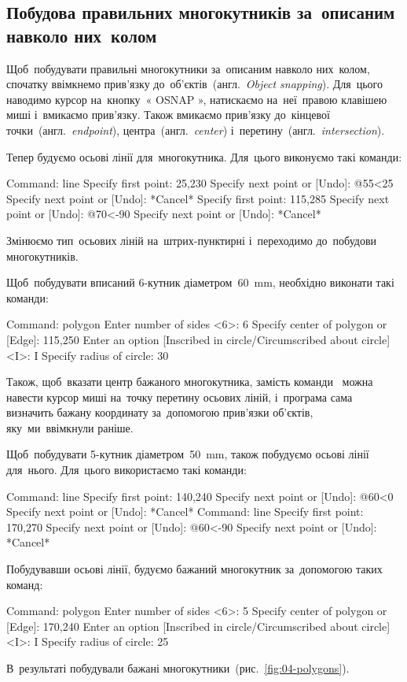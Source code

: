 \documentclass[
	a4paper,
	oneside,
	BCOR = 10mm,
	DIV = 12,
	12pt,
	headings = normal,
]{scrartcl}
\newcommand{\allcaps}[1]{%
	{%
		\addfontfeatures{%
			Letters = UppercaseSmallCaps,
			LetterSpace = 8,%
		}%
		#1%
	}%
}
\newcommand{\transeng}[1]{{англ.}~\textit{\textenglish{#1}}}
\begin{document}
		\subsection{Побудова правильних многокутників за~описаним навколо них~колом}
			Щоб~побудувати правильні многокутники за~описаним навколо них~колом, спочатку ввімкнемо прив'язку до~об'єктів~(\transeng{Object snapping}). Для~цього наводимо курсор на~кнопку~«\textenglish{\allcaps{OSNAP}}», натискаємо на~неї~правою клавішею миші і~вмикаємо прив'язку. Також вмикаємо прив'язку до~кінцевої точки~(\transeng{endpoint}), центра~(\transeng{center}) і~перетину~(\transeng{intersection}).

			Тепер будуємо осьові лінії для~многокутника. Для~цього виконуємо такі команди:
			\begin{codegeneric}
				Command: line
				Specify first point: 25,230
				Specify next point or [Undo]: @55<25
				Specify next point or [Undo]: *Cancel*
				Specify first point: 115,285
				Specify next point or [Undo]: @70<-90
				Specify next point or [Undo]: *Cancel*
			\end{codegeneric}
			Змінюємо тип~осьових ліній на~штрих-пунктирні і~переходимо до~побудови многокутників.

			Щоб~побудувати вписаний 6-кутник діаметром~\SI{60}{\milli\metre}, необхідно виконати такі команди:
			\begin{codegeneric}
				Command: polygon
				Enter number of sides <6>: 6
				Specify center of polygon or [Edge]: 115,250
				Enter an option [Inscribed in circle/Circumscribed about circle] <I>: I
				Specify radius of circle: 30
			\end{codegeneric}
			Також, щоб~вказати центр бажаного многокутника, замість команди~ можна навести курсор миші на~точку перетину осьових ліній, і~програма сама визначить бажану координату за~допомогою прив'язки об'єктів, яку~ми~ввімкнули раніше.

			Щоб~побудувати 5-кутник діаметром~\SI{50}{\milli\metre}, також побудуємо осьові лінії для~нього. Для~цього використаємо такі команди:
			\begin{codegeneric}
				Command: line
				Specify first point: 140,240
				Specify next point or [Undo]: @60<0
				Specify next point or [Undo]: *Cancel*
				Command: line
				Specify first point: 170,270
				Specify next point or [Undo]: @60<-90
				Specify next point or [Undo]: *Cancel*
			\end{codegeneric}
			Побудувавши осьові лінії, будуємо бажаний многокутник за~допомогою таких команд:
			\begin{codegeneric}
				Command: polygon
				Enter number of sides <6>: 5
				Specify center of polygon or [Edge]: 170,240
				Enter an option [Inscribed in circle/Circumscribed about circle] <I>: I
				Specify radius of circle: 25
			\end{codegeneric}
			В~результаті побудували бажані многокутники~(рис.~\ref{fig:04-polygons}).
\end{document}
